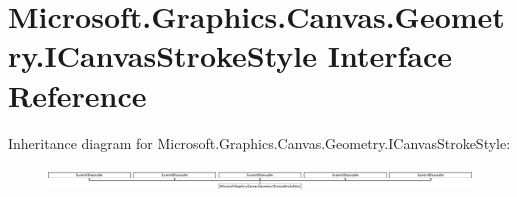\hypertarget{interface_microsoft_1_1_graphics_1_1_canvas_1_1_geometry_1_1_i_canvas_stroke_style}{}\section{Microsoft.\+Graphics.\+Canvas.\+Geometry.\+I\+Canvas\+Stroke\+Style Interface Reference}
\label{interface_microsoft_1_1_graphics_1_1_canvas_1_1_geometry_1_1_i_canvas_stroke_style}
Inheritance diagram for Microsoft.\+Graphics.\+Canvas.\+Geometry.\+I\+Canvas\+Stroke\+Style\+:\begin{figure}[H]
\begin{center}
\leavevmode
\includegraphics[height=0.645533cm]{interface_microsoft_1_1_graphics_1_1_canvas_1_1_geometry_1_1_i_canvas_stroke_style}
\end{center}
\end{figure}
